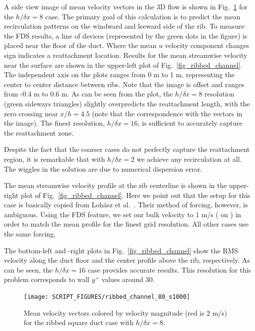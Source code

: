 \documentclass[11pt]{book}
\begin{document}
A side view image of mean velocity vectors in the 3D flow is shown in Fig.~\ref{fig_ribbed_channel_image} for the $h/\delta x = 8$ case.  The primary goal of this calculation is to predict the mean recirculation patterns on the windward and leeward side of the rib.  To measure the FDS results, a line of devices (represented by the green dots in the figure) is placed near the floor of the duct.  Where the mean $u$ velocity component changes sign indicates a reattachment location.  Results for the mean streamwise velocity near the surface are shown in the upper-left plot of Fig.~\ref{fig_ribbed_channel}.  The independent axis on the plots ranges from 0 m to 1 m, representing the center to center distance between ribs.  Note that the image is offset and ranges from -0.4 m to 0.6 m.  As can be seen from the plot, the $h/\delta x = 8$ resolution (green sideways triangles) slightly overpredicts the reattachment length, with the zero crossing near $x/h = 4.5$ (note that the correspondence with the vectors in the image).  The finest resolution, $h/\delta x=16$, is sufficient to accurately capture the reattachment zone.

Despite the fact that the coarser cases do not perfectly capture the reattachment region, it is remarkable that with $h/\delta x = 2$ we achieve any recirculation at all.  The wiggles in the solution are due to numerical dispersion error.

The mean streamwise velocity profile at the rib centerline is shown in the upper-right plot of Fig.~\ref{fig_ribbed_channel}.  Here we point out that the setup for this case is basically copied from Loh\'asz et al.~\cite{Lohasz:1}.  Their method of forcing, however, is ambiguous.  Using the FDS  feature, we set our bulk velocity to 1 m/s ( on ) in order to match the mean profile for the finest grid resolution.  All other cases use the same forcing.

The bottom-left and -right plots in Fig.~\ref{fig_ribbed_channel} show the RMS velocity along the duct floor and the center profile above the rib, respectively. As can be seen, the $h/\delta x = 16$ case provides accurate results.  This resolution for this problem corresponds to wall $y^+$ values around 30.

\begin{figure}[ht]
\centering
\texttt{[image: SCRIPT\_FIGURES/ribbed\_channel\_80\_s1000]}
\caption[The {\ct ribbed\_channel} test case]{Mean velocity vectors colored by velocity magnitude (red is 2 m/s) for the ribbed square duct case with $h/\delta x = 8$.}
\label{fig_ribbed_channel_image}
\end{figure}
\end{document}
